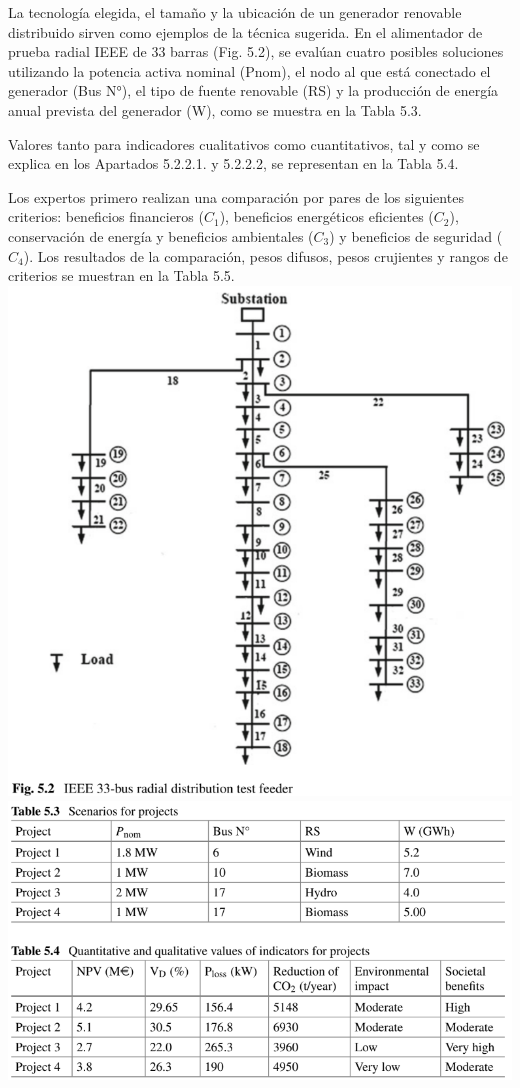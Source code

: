\documentclass[
]{article}
\begin{document}
La tecnología elegida, el tamaño y la ubicación de un generador
renovable distribuido sirven como ejemplos de la técnica sugerida. En el
alimentador de prueba radial IEEE de 33 barras (Fig. 5.2), se evalúan
cuatro posibles soluciones utilizando la potencia activa nominal (Pnom),
el nodo al que está conectado el generador (Bus N°), el tipo de fuente
renovable (RS) y la producción de energía anual prevista del generador
(W), como se muestra en la Tabla 5.3.

Valores tanto para indicadores cualitativos como cuantitativos, tal y
como se explica en los Apartados 5.2.2.1. y 5.2.2.2, se representan en
la Tabla 5.4.

Los expertos primero realizan una comparación por pares de los
siguientes criterios: beneficios financieros (\(C_1\)), beneficios
energéticos eficientes (\(C_2\)), conservación de energía y beneficios
ambientales (\(C_3\)) y beneficios de seguridad (\(C_4\)). Los
resultados de la comparación, pesos difusos, pesos crujientes y rangos
de criterios se muestran en la Tabla 5.5.
\includegraphics{fotos/foto2.png} \includegraphics{fotos/tabla5.png}
\end{document}
